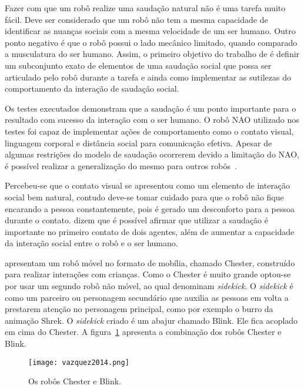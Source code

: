 Fazer com que um robô realize uma saudação natural não é uma tarefa muito fácil. Deve ser considerado que um robô não tem a mesma capacidade de identificar as nuanças sociais com a mesma velocidade de um ser humano. Outro ponto negativo é que o robô possui o lado mecânico limitado, quando comparado a musculatura do ser humano. Assim, o primeiro objetivo do trabalho de  é definir um subconjunto exato de elementos de uma saudação social que possa ser articulado pelo robô durante a tarefa e ainda como implementar as sutilezas do comportamento da interação de saudação social.

Os testes executados demonstram que a saudação é um ponto importante para o resultado com sucesso da interação com o ser humano. O robô NAO utilizado nos testes foi capaz de implementar ações de comportamento como o contato visual, linguagem corporal e distância social para comunicação efetiva. Apesar de algumas restrições do modelo de saudação ocorrerem devido a limitação do NAO, é possível realizar a generalização do mesmo para outros robôs~\cite{Heenan:2014}.

Percebeu-se que o contato visual se apresentou como um elemento de interação social bem natural, contudo deve-se tomar cuidado para que o robô não fique encarando a pessoa constantemente, pois é gerado um desconforto para a pessoa durante o contato.  dizem que é possível afirmar que utilizar a saudação é importante no primeiro contato de dois agentes, além de aumentar a capacidade da interação social entre o robô e o ser humano.

 apresentam um robô móvel no formato de mobília, chamado Chester, construído para realizar interações com crianças. Como o Chester é muito grande optou-se por usar um segundo robô não móvel, ao qual  denominam \emph{sidekick}. O \emph{sidekick} é como um parceiro ou personagem secundário que auxilia as pessoas em volta a prestarem atenção no personagem principal, como por exemplo o burro da animação Shrek. O \emph{sidekick} criado é um abajur chamado Blink. Ele fica acoplado em cima do Chester. A figura~\ref{fig:vazquez} apresenta a combinação dos robôs Chester e Blink.

\begin{figure}[ht!]
	\centering
	\caption{Os robôs Chester e Blink.}
	\texttt{[image: vazquez2014.png]}
	\label{fig:vazquez}
\end{figure}

